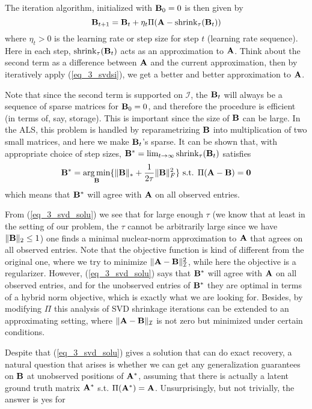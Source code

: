 \documentclass[../book-template.tex]{subfiles}
\begin{document}
The iteration algorithm, initialized with ${\bf B}_0=0$ is then given by
\begin{equation}\label{eq_3_svdsi}
	{\bf B}_{t+1} = {\bf B}_t + \eta_t\Pi({\bf A}-\text{shrink}_{\tau}({\bf B}_t))
\end{equation}
where $\eta_t>0$ is the learning rate or step size for step $t$ (learning rate sequence). Here in each step, $\text{shrink}_{\tau}({\bf B}_t)$ acts as an approximation to ${\bf A}$. Think about the second term as a difference between ${\bf A}$ and the current approximation, then by iteratively apply (\ref{eq_3_svdsi}), we get a better and better approximation to ${\bf A}$. 
\par Note that since the second term is supported on $\mathcal{I}$, the ${\bf B}_t$ will always be a sequence of sparse matrices for ${\bf B}_0=0$, and therefore the procedure is efficient (in terms of, say, storage). This is important since the size of ${\bf B}$ can be large. In the ALS, this problem is handled by reparametrizing ${\bf B}$ into multiplication of two small matrices, and here we make ${\bf B}_t$'s sparse. It can be shown that, with appropriate choice of step sizes, ${\bf B}^* = \lim_{t\rightarrow\infty}\text{shrink}_{\tau}({\bf B}_t)$ satisfies
\begin{equation}\label{eq_3_svd_solu}
	{\bf B}^* =\mathop{\arg\min}_{{\bf B}}\{\|{\bf B}\|_*+\frac{1}{2\tau}\|{\bf B}\|^2_F\} \text{ s.t. }\Pi({\bf A}-{\bf B})=\bm{0}
\end{equation}
which means that ${\bf B}^*$ will agree with ${\bf A}$ on all observed entries. 
\par From (\ref{eq_3_svd_solu}) we see that for large enough $\tau$ (we know that at least in the setting of our problem, the $\tau$ cannot be arbitrarily large since we have $\|{\bf B}\|_2\leq 1$) one finds a minimal nuclear-norm approximation to ${\bf A}$ that agrees on all observed entries. Note that the objective function is kind of different from the original one, where we try to minimize $\|{\bf A}-{\bf B}\|_{\mathcal{I}}^2$, while here the objective is a regularizer. However, (\ref{eq_3_svd_solu}) says that ${\bf B}^*$ will agree with ${\bf A}$ on all observed entries, and for the unobserved entries of ${\bf B}^*$ they are optimal in terms of a hybrid norm objective, which is exactly what we are looking for. Besides, by modifying $\Pi$ this analysis of SVD shrinkage iterations can be extended to an approximating setting, where $\|{\bf A}-{\bf B}\|_{\mathcal{I}}$ is not zero but minimized under certain conditions.
\par Despite that (\ref{eq_3_svd_solu}) gives a solution that can do exact recovery, a natural question that arises is whether we can get any generalization guarantees on ${\bf B}$ at unobserved positions of ${\bf A^*}$, assuming that there is actually a latent ground truth matrix ${\bf A}^*$ s.t. $\Pi({\bf A}^*)={\bf A}$. Unsurprisingly, but not trivially, the answer is yes for
\end{document}
